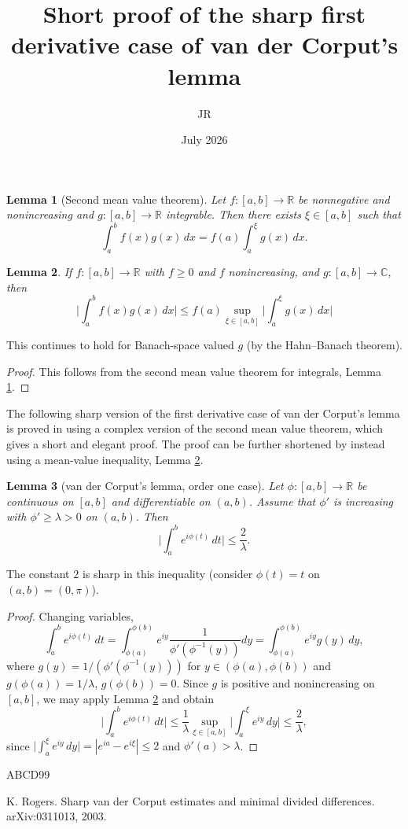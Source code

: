 \documentclass{article}
\title{Short proof of the sharp first derivative case of van der Corput's lemma}
\author{JR}
\date{July 2026}
\newtheorem{lemma}{Lemma}
\begin{document}
\maketitle



\begin{lemma}[Second mean value theorem]\label{smvt}
Let $f:[a,b]\to\mathbb{R}$ be nonnegative and nonincreasing and $g:[a,b]\to\mathbb{R}$ integrable. Then there exists $\xi\in [a,b]$ such that
\[ \int_a^b f(x)g(x)\,dx = f(a) \int_a^\xi g(x)\,dx. \]
\end{lemma}

\begin{lemma}\label{mvt-ineq}
If $f:[a,b]\to \mathbb{R}$ with $f\ge 0$ and $f$ nonincreasing, and $g:[a,b]\to \mathbb{C}$, then
\[ \Big|\int_a^b f(x)g(x)\,dx\Big| \le  f(a) \sup_{\xi\in [a,b]} \Big|\int_a^\xi g(x)\,dx\Big| \]
\end{lemma}

 This continues to hold for Banach-space valued $g$ (by the Hahn--Banach theorem).

\begin{proof}
This follows from the second mean value theorem for integrals, Lemma \ref{smvt}.
\end{proof}

The following sharp version of the first derivative case of van der Corput's lemma is proved in \cite[Cor. 5]{Rog03} using a complex version of the second mean value theorem, which gives a short and elegant proof. The proof can be further shortened by instead using a mean-value inequality, Lemma \ref{mvt-ineq}.

\begin{lemma}[van der Corput's lemma, order one case]
Let $\phi:[a,b]\to\mathbb{R}$ be continuous on $[a,b]$ and differentiable on $(a,b)$. Assume that $\phi'$ is increasing with $\phi'\ge \lambda>0$ on $(a,b)$.
Then
\[ \Big|\int_a^b e^{i\phi(t)}\,dt\Big|\le \frac{2}{\lambda}. \]
\end{lemma}

 The constant $2$ is sharp in this inequality (consider $\phi(t)=t$ on $(a,b)=(0,\pi)$).

\begin{proof}
Changing variables,
\[ \int_a^b e^{i\phi(t)}\,dt = \int_{\phi(a)}^{\phi(b)} e^{iy} \frac1{ \phi'(\phi^{-1}(y))} dy = \int_{\phi(a)}^{\phi(b)} e^{iy} g(y)\,dy, \]
where $g(y)=1/(\phi'(\phi^{-1}(y)))$ for $y\in (\phi(a), \phi(b))$ and $g(\phi(a))=1/\lambda$, $g(\phi(b))=0$.
Since $g$ is positive and nonincreasing on $[a,b]$, we may apply Lemma \ref{mvt-ineq} and obtain
\[ \Big|\int_a^b e^{i\phi(t)}\,dt\Big| \le \frac{1}{\lambda} \sup_{\xi\in [a,b]} \Big|\int_a^\xi e^{iy}\,dy\Big| \le \frac{2}{\lambda},
\]
since
$\Big|\int_a^\xi e^{iy}\,dy\Big|=|e^{ia}-e^{i\xi}|\le 2$ and $\phi'(a)>\lambda$.

\end{proof}


\begin{thebibliography}{ABCD99}

 K. Rogers. Sharp van der Corput estimates and minimal divided differences. arXiv:0311013, 2003.

\end{thebibliography}
\end{document}
